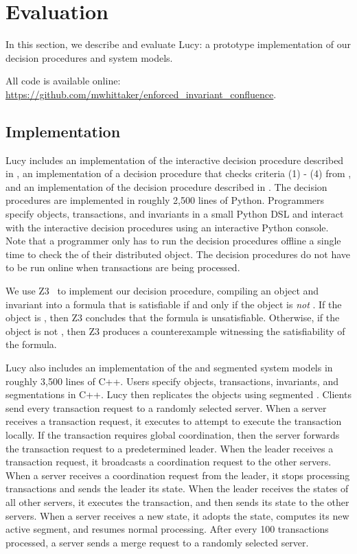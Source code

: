 \section{Evaluation}
In this section, we describe and evaluate Lucy: a prototype implementation of
our decision procedures and system models.
\begin{revisions}
  All code is available online:
  \url{https://github.com/mwhittaker/enforced_invariant_confluence}.
\end{revisions}

\subsection{Implementation}
Lucy includes an implementation of the interactive decision procedure described
in , an implementation of a decision
procedure that checks criteria (1) - (4) from , and an
implementation of the decision procedure described in
. The decision procedures
are implemented in roughly 2,500 lines of Python. Programmers specify objects,
transactions, and invariants in a small Python DSL and interact with the
interactive decision procedures using an interactive Python console. Note that
a programmer only has to run the decision procedures offline a single time to
check the \invariantconfluence{} of their distributed object. The decision
procedures do not have to be run online when transactions are being processed.

We use Z3~\cite{de2008z3} to implement our \invariantclosure{} decision procedure,
compiling an object and invariant into a formula that is satisfiable if and
only if the object is \emph{not} \invariantclosed{}. If the object is
\invariantclosed{}, then Z3 concludes that the formula is unsatisfiable.
Otherwise, if the object is not \invariantclosed{}, then Z3 produces a
counterexample witnessing the satisfiability of the formula.

Lucy also includes an implementation of the \invariantconfluence{} and
segmented \invariantconfluence{} system models in roughly 3,500 lines of C++.
Users specify objects, transactions, invariants, and segmentations in C++. Lucy
then replicates the objects using segmented \invariantconfluence{}. Clients
send every transaction request to a randomly selected server. When a server
receives a transaction request, it executes  to attempt
to execute the transaction locally.  If the transaction requires global
coordination, then the server forwards the transaction request to a
predetermined leader. When the leader receives a transaction request, it
broadcasts a coordination request to the other servers. When a server receives
a coordination request from the leader, it stops processing transactions and
sends the leader its state. When the leader receives the states of all other
servers, it executes the transaction, and then sends its state to the other
servers. When a server receives a new state, it adopts the state, computes its
new active segment, and resumes normal processing. After every 100 transactions
processed, a server sends a merge request to a randomly selected server.

